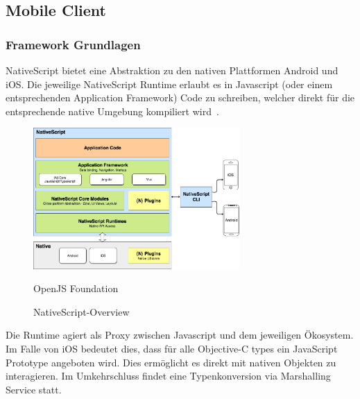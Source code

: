 \subsection{Mobile Client}\label{subsec:mobile-client}

\subsubsection{Framework Grundlagen}
NativeScript bietet eine Abstraktion zu den nativen Plattformen Android und iOS.
Die jeweilige NativeScript Runtime erlaubt es in Javascript (oder einem entsprechenden Application Framework) Code zu schreiben, welcher direkt für die entsprechende native Umgebung kompiliert wird~\cite{ns-core-overview}.
\begin{figure}[h]
    \centering
    \label{fig:howNSWorks}
    \includegraphics[width=0.7\textwidth]{graphics/ns-common}\caption[NativeScript-Overview]{NativeScript-Overview}\textcopyright OpenJS Foundation
\end{figure}

Die Runtime agiert als Proxy zwischen Javascript und dem jeweiligen Ökosystem.
Im Falle von iOS bedeutet dies, dass für alle Objective-C types ein JavaScript Prototype angeboten wird.
Dies ermöglicht es direkt mit nativen Objekten zu interagieren.
Im Umkehrschluss findet eine Typenkonversion via Marshalling Service statt\cite{ns-ios-runtime}.




